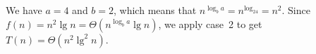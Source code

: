 We have $a=4$ and $b=2$, which means that $n^{\log_ba}=n^{\log_24}=n^2$.
Since $f(n)=n^2\lg n=\Theta(n^{\log_ba}\lg n)$, we apply case~2 to get $T(n)=\Theta(n^2\lg^2n)$.
